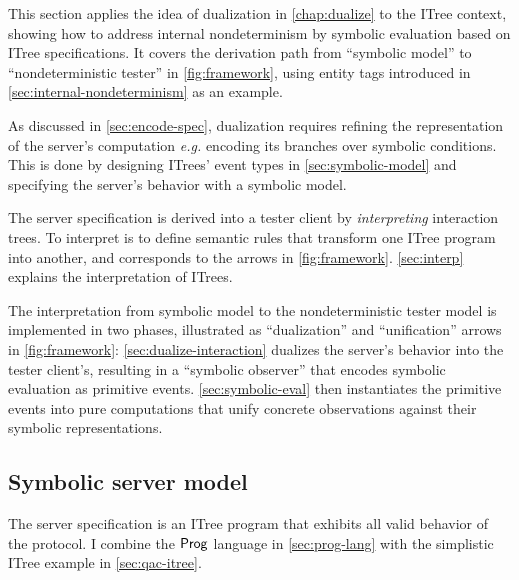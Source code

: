 This section applies the idea of dualization in \autoref{chap:dualize} to the
ITree context, showing how to address internal nondeterminism by symbolic
evaluation based on ITree specifications.  It covers the derivation path from
``symbolic model'' to ``nondeterministic tester'' in \autoref{fig:framework},
using \http entity tags introduced in \autoref{sec:internal-nondeterminism} as
an example.

As discussed in \autoref{sec:encode-spec}, dualization requires refining the
representation of the server's computation {\it e.g.} encoding its branches over
symbolic conditions.  This is done by designing ITrees' event types in
\autoref{sec:symbolic-model} and specifying the server's behavior with a
symbolic model.

The server specification is derived into a tester client by {\em interpreting}
interaction trees.  To interpret is to define semantic rules that transform one
ITree program into another, and corresponds to the arrows in
\autoref{fig:framework}.  \autoref{sec:interp} explains the interpretation of
ITrees.

The interpretation from symbolic model to the nondeterministic tester model is
implemented in two phases, illustrated as ``dualization'' and ``unification''
arrows in \autoref{fig:framework}: \autoref{sec:dualize-interaction} dualizes
the server's behavior into the tester client's, resulting in a ``symbolic
observer'' that encodes symbolic evaluation as primitive events.
\autoref{sec:symbolic-eval} then instantiates the primitive events into
pure computations that unify concrete observations against their symbolic
representations.

\subsection{Symbolic server model}
\label{sec:symbolic-model}
The server specification is an ITree program that exhibits all valid behavior of
the protocol.  I combine the $\mathsf{Prog}$ language in \autoref{sec:prog-lang} with the
simplistic ITree example in \autoref{sec:qac-itree}.

